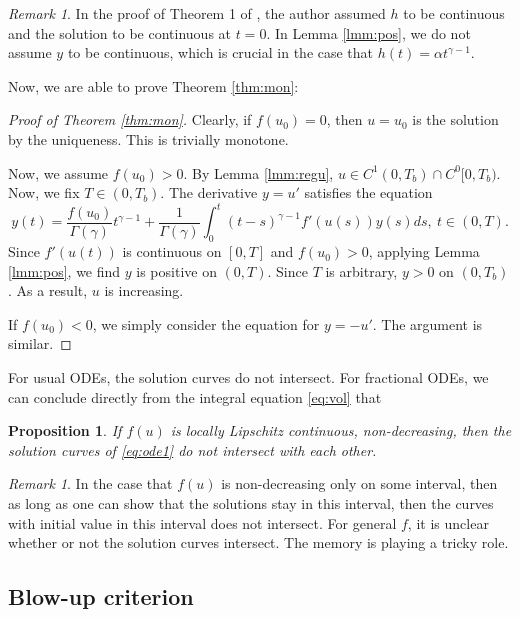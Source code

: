\documentclass[12pt]{amsart}%
\newtheorem{pro}[thm]{Proposition}
\theoremstyle{definition}
\theoremstyle{remark}
\newtheorem{rmk}[thm]{Remark}
\begin{document}
\begin{rmk}
In the proof of Theorem 1 of \cite{weis75}, the author assumed $h$ to be continuous and the solution to be continuous at $t=0$. In Lemma \ref{lmm:pos}, we do not assume $y$ to be continuous, which is crucial in the case that $h(t)=\alpha t^{\gamma-1}$. 
\end{rmk}

Now, we are able to prove Theorem \ref{thm:mon}:

\begin{proof}[Proof of Theorem \ref{thm:mon}]
Clearly, if $f(u_0)=0$, then $u=u_0$ is the solution by the uniqueness. This is trivially monotone.

Now, we assume $f(u_0)>0$. 
By Lemma \ref{lmm:regu}, $u\in C^1(0,T_b)\cap C^0[0,T_b)$. Now, we fix $T\in (0, T_b)$. The derivative $y=u'$ satisfies the equation \[
y(t)=\frac{f(u_0)}{\Gamma(\gamma)}t^{\gamma-1}+\frac{1}{\Gamma(\gamma)}\int_0^t (t-s)^{\gamma-1}f'(u(s))y(s) ds,~t\in (0, T).
\]
Since $f'(u(t))$ is continuous on $[0, T]$ and $f(u_0)>0$, applying
Lemma \ref{lmm:pos}, we find $y$ is positive on $(0, T)$.
Since $T$ is arbitrary, $y>0$ on $(0, T_b)$. As a result, $u$ is increasing.

If $f(u_0)<0$, we simply consider the equation for $y=-u'$. The argument is similar.
\end{proof}

For usual ODEs, the solution curves do not intersect. For fractional ODEs, we can conclude directly from the integral equation \eqref{eq:vol} that
\begin{pro}\label{pro:nointersect}
If $f(u)$ is locally Lipschitz continuous, non-decreasing, then the solution curves of \eqref{eq:ode1} do not intersect with each other.
\end{pro}

\begin{rmk}\label{rmk:nonintersect}
In the case that $f(u)$ is non-decreasing only on some interval, then as long as one can show that the solutions stay in this interval, then the curves with initial value in this interval does not intersect. For general $f$, it is unclear whether or not the solution curves intersect. The memory is playing a tricky role. 
\end{rmk}

\subsection{Blow-up criterion}
\end{document}

